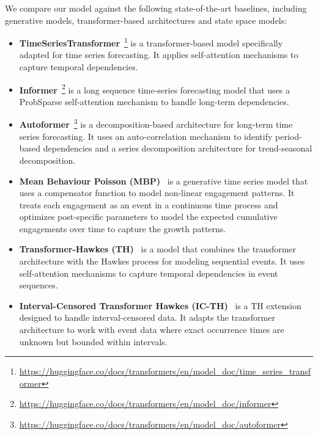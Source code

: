 We compare our \icmamba model against the following state-of-the-art baselines, including generative models, transformer-based architectures and state space models:
\begin{itemize}[leftmargin=*]
    \setlength\itemsep{0em}
    \item \textbf{TimeSeriesTransformer}~\cite{li2019enhancing}\footnote{\url{https://huggingface.co/docs/transformers/en/model_doc/time_series_transformer}} is a transformer-based model specifically adapted for time series forecasting. It applies self-attention mechanisms to capture temporal dependencies.
    \item \textbf{Informer}~\cite{zhou2021informer}\footnote{\url{https://huggingface.co/docs/transformers/en/model_doc/informer}} is a long sequence time-series forecasting model that uses a ProbSparse self-attention mechanism to handle long-term dependencies.
    \item \textbf{Autoformer}~\cite{wu2021autoformer}\footnote{\url{https://huggingface.co/docs/transformers/en/model_doc/autoformer}} is a decomposition-based architecture for long-term time series forecasting. It uses an auto-correlation mechanism to identify period-based dependencies and a series decomposition architecture for trend-seasonal decomposition.
    \item \textbf{Mean Behaviour Poisson (MBP)}~\cite{rizoiu2022interval} is a generative time series model that uses a compensator function to model non-linear engagement patterns. It treats each engagement as an event in a continuous time process and optimizes post-specific parameters to model the expected cumulative engagements over time to capture the growth patterns.
    \item \textbf{Transformer-Hawkes (TH)}~\cite{zuo2020transformer} is a model that combines the transformer architecture with the Hawkes process for modeling sequential events. It uses self-attention mechanisms to capture temporal dependencies in event sequences.
    \item \textbf{Interval-Censored Transformer Hawkes (IC-TH)}~\cite{kong2023interval} is a TH extension designed to handle interval-censored data. It adapts the transformer architecture to work with event data where exact occurrence times are unknown but bounded within intervals.

\end{itemize}
